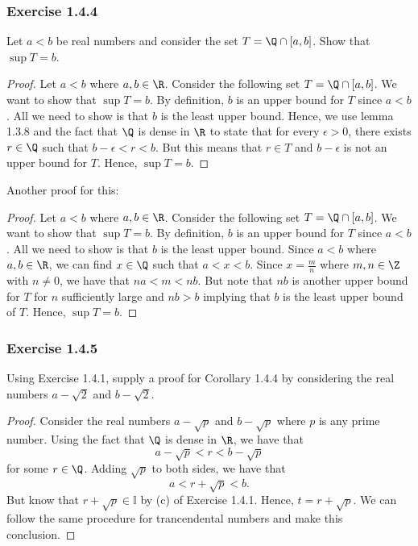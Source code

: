     \subsubsection{Exercise 1.4.4}
    Let \( a < b \) be real numbers and consider the set \( T = \Q \cap [a,b]\). Show that \( \sup T = b \). 

        \begin{proof}
            Let \( a < b \) where \( a,b \in \R \). Consider the following set \( T = \Q \cap [a,b] \). We want to show that \( \sup T = b \). By definition, \( b \) is an upper bound for \( T \) since \( a < b \). All we need to show is that \( b \) is the least upper bound. Hence, we use lemma 1.3.8 and the fact that \( \Q \) is dense in \( \R  \) to state that for every \( \epsilon > 0 \), there exists \( r \in \Q \) such that \( b - \epsilon < r < b \). But this means that \( r \in T \) and \( b - \epsilon \) is not an upper bound for \( T \). Hence, \( \sup T = b \).


        \end{proof}
    

    Another proof for this: 

        \begin{proof}
            Let \( a < b \) where \( a,b \in \R \). Consider the following set \( T = \Q \cap [a,b] \). We want to show that \( \sup T = b \). By definition, \( b \) is an upper bound for \( T \) since \( a < b \). All we need to show is that \( b \) is the least upper bound. Since \( a < b \) where \( a,b \in \R \), we can find \(x \in \Q \) such that \( a < x < b \). Since \( x = \frac{m}{n}\) where \( m,n \in \Z \) with \( n \neq 0 \), we have that \( na < m < nb\). But note that \( nb \) is another upper bound for \( T \) for \( n \) sufficiently large and \( nb > b \) implying that \( b \) is the least upper bound of \( T \). Hence, \( \sup T = b \).
        \end{proof}
    

    \subsubsection{Exercise 1.4.5}

    Using Exercise 1.4.1, supply a proof for Corollary 1.4.4 by considering the real numbers \( a - \sqrt{2} \) and \( b - \sqrt{2}\). 

        \begin{proof}
            Consider the real numbers \( a - \sqrt{p}\) and \( b - \sqrt{p}\) where \( p \) is any prime number. Using the fact that \( \Q \) is dense in \( \R \), we have that 
            \[ a - \sqrt{p} < r < b - \sqrt{p} \] 
            for some \( r \in \Q \). Adding \( \sqrt{p} \) to both sides, we have that 
            \[ a < r + \sqrt{p} < b .\]
            But know that \( r + \sqrt{p} \in \mathbb{I} \) by (c) of Exercise 1.4.1. Hence, \( t = r + \sqrt{p} \). We can follow the same procedure for trancendental numbers and make this conclusion. 
        \end{proof}
    


